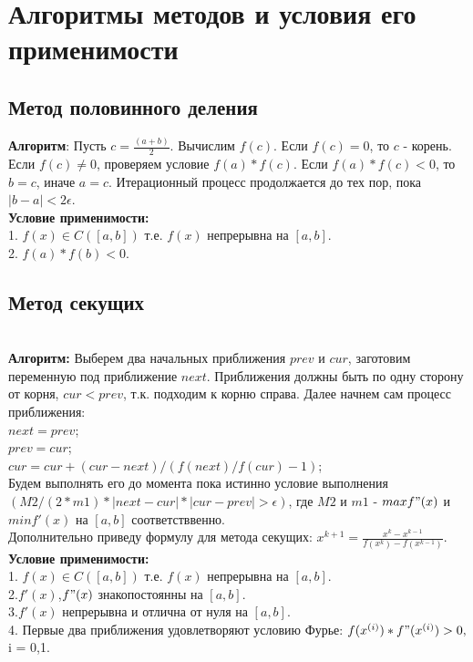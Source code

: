 \documentclass[12pt]{article}
\begin{document}
\section{Алгоритмы методов и условия его применимости}
\subsection{Метод половинного деления}
\textbf{Алгоритм}: Пусть $c = \frac{(a+b)}{2}$. Вычислим $f(c)$. Если $f(c)=0$, то $c$ - корень. Если $f(c)\neq0$, проверяем условие $f(a)*f(c)$. Если $f(a)*f(c)<0$, то $b=c$, иначе $a=c$. Итерационный процесс продолжается до тех пор, пока $|b-a|<2\epsilon$.  \\
\textbf{Условие применимости:}\\
1. $f(x)\in C([a,b])$ т.е. $f(x)$ непрерывна на $[a,b]$.\\
2. $f(a)*f(b)<0$.\\
\subsection{Метод секущих}\\
\textbf{Алгоритм:} Выберем два начальных приближения $prev$ и $cur$, заготовим переменную под приближение $next$. Приближения должны быть по одну сторону от корня, $cur < prev$, т.к. подходим к корню справа. Далее начнем сам процесс приближения:\\
$next = prev$;\\
$prev = cur$;\\
$cur = cur + (cur - next) / (f(next) / f(cur) - 1)$;\\
Будем выполнять его до момента пока истинно условие выполнения $(M2 / (2 * m1) * |next - cur| * |cur - prev| > \epsilon)$, где $M2$ и $m1$ - $max f"(x)$ и $min f'(x)$  на $[a,b]$ соответстввенно.\\
Дополнительно приведу формулу для метода секущих: $x^{k+1}=\frac{x^{k}-x^{k-1}}{f(x^{k})-f(x^{k-1})}$.
\textbf{Условие применимости:}\\
1. $f(x)\in C([a,b])$ т.е. $f(x)$ непрерывна на $[a,b]$.\\
2.$f'(x)$,$f"(x)$ знакопостоянны на $[a,b]$.\\
3.$f'(x)$ непрерывна и отлична от нуля на $[a,b]$.\\
4. Первые два приближения удовлетворяют условию Фурье: $f(x^{(i)})*f"(x^{(i)})>0,$ i = {0,1}.\\
\end{document}
